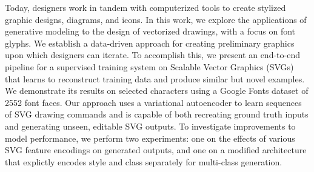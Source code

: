 Today, designers work in tandem with computerized tools to create stylized graphic designs, diagrams, and icons.
In this work, we explore the applications of generative modeling to the design of vectorized drawings, with a focus on font glyphs.
We establish a data-driven approach for creating preliminary graphics upon which designers can iterate.
To accomplish this, we present an end-to-end pipeline for a supervised training system on Scalable Vector Graphics (SVGs) that learns to reconstruct training data and produce similar but novel examples.
We demonstrate its results on selected characters using a Google Fonts dataset of 2552 font faces.
Our approach uses a variational autoencoder to learn sequences of SVG drawing commands and is capable of both recreating ground truth inputs and generating unseen, editable SVG outputs.
To investigate improvements to model performance, we perform two experiments: one on the effects of various SVG feature encodings on generated outputs, and one on a modified architecture that explictly encodes style and class separately for multi-class generation.
